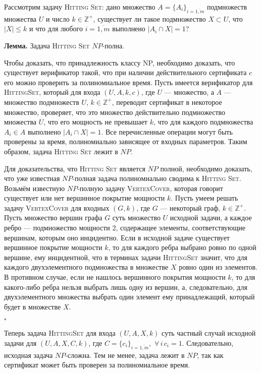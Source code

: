 \documentclass[10pt]{article}
\begin{document}
\par Рассмотрим задачу \textsc{Hitting Set}: дано множество $A=\{A_i\}_{i=\overline{1, m}}$ подмножеств множества $U$ и число $k\in\mathbb{Z}^+$, существует ли такое подмножество $X\subset U$, что $|X|\leq k$ и что для любого $i=\overline{1, m}$ выполнено $|A_i\cap X| = 1$?
\medskip\par
\textbf{Лемма.} Задача \textsc{Hitting Set} $NP$-полна.

\medskip\par 
Чтобы доказать, что принадлежность классу NP, необходимо доказать, что существует
верификатор такой, что при наличии действительного сертификата $c$ его можно проверить
за полиномиальное время. Пусть имеется верификатор для \textsc{HittingSet}, который для входа $(U, A, k, c)$, где $U$ --- множество, а $A$ --- множество подмножеств $U$, $k\in\mathbb{Z}^+$, переводит сертификат в некоторое множество, проверяет, что это множество действительно подмножество множества $U$, что его мощность не превышает $k$, что для каждого подмножества $A_i \in A$ выполнено $|A_i\cap X| = 1$. Все перечисленные операции могут быть проверены за время, полиномиально зависящее от входных параметров. Таким образом, задача \textsc{Hitting Set} лежит в $NP$.
\medskip\par 
Для доказательства, что \textsc{Hitting Set} является $NP$ полной, необходимо доказать, что уже известная $NP$-полная задача полиномиально сводима к \textsc{Hitting Set}. Возьмём известную $NP$-полную задачу \textsc{VertexCover}, которая говорит существует или нет вершинное покрытие мощности $k$. Пусть умеем решать задачу \textsc{VertexCover} для входных $(G, k)$, где $G$ --- некоторый граф, $k\in\mathbb{Z}^+$. Пусть множество вершин графа $G$ суть множество $U$ исходной задачи, а каждое ребро --- подмножество мощности $2$, содержащее элементы, соответствующие вершинам, которым оно инцидентно. Если в исходной задаче существует вершинное покрытие мощности $k$, то для каждого ребра выбрано ровно по одной вершине, ему инцидентной, что в терминах задачи \textsc{HittingSet} значит, что для каждого двухэлементного подмножества в множестве $X$ ровно один из элементов. В противном случае, если не нашлось вершинного покрытия мощности $k$, то для какого-либо ребра нельзя выбрать лишь одну из вершин, а, следовательно, для двухэлементного множества выбрать один элемент ему принадлежащий, который будет в множестве $X$.
\begin{flushright}
$\square$
\end{flushright}
\par
Теперь задача \textsc{HittingSet} для входа $(U, A, X, k)$ суть частный случай исходной задачи для $(U, A, X, C, k)$, где $C=\{c_i\}_{i=\overline{1, m}},$ $\forall\, i\, c_i=1$. Следовательно, исходная задача $NP$-сложна. Тем не менее, задача лежит в $NP$, так как сертификат может быть проверен за полиномиальное время.
\end{document}
